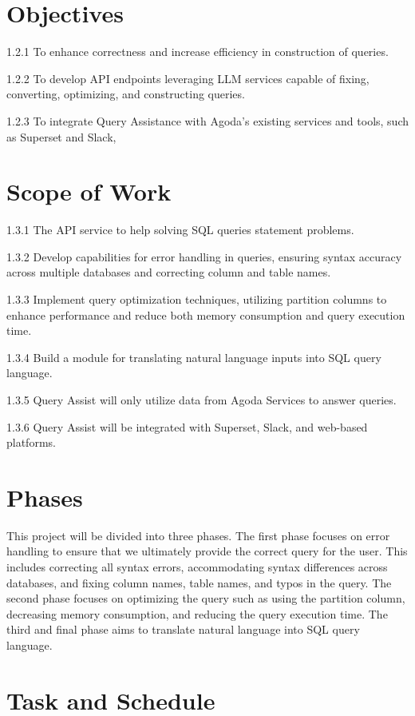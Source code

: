 \section{Objectives}
1.2.1 	To enhance correctness and increase efficiency in construction of queries.

1.2.2 	To develop API endpoints leveraging LLM services capable of fixing, converting, optimizing, and constructing queries.

1.2.3	To integrate Query Assistance with Agoda's existing services and tools, such as Superset and Slack,

\section{Scope of Work}
1.3.1	The API service to help solving SQL queries statement problems.

1.3.2	Develop capabilities for error handling in queries, ensuring syntax accuracy across multiple databases and correcting column and table names.

1.3.3	Implement query optimization techniques, utilizing partition columns to enhance performance and reduce both memory consumption and query execution time.

1.3.4	Build a module for translating natural language inputs into SQL query language.

1.3.5	Query Assist will only utilize data from Agoda Services to answer queries.

1.3.6	Query Assist will be integrated with Superset, Slack, and web-based platforms.

\section{Phases}
This project will be divided into three phases. The first phase focuses on error handling to ensure that we ultimately provide the correct query for the user. This includes correcting all syntax errors, accommodating syntax differences across databases, and fixing column names, table names, and typos in the query. The second phase focuses on optimizing the query such as using the partition column, decreasing memory consumption, and reducing the query execution time. The third and final phase aims to translate natural language into SQL query language.

\section{Task and Schedule}
